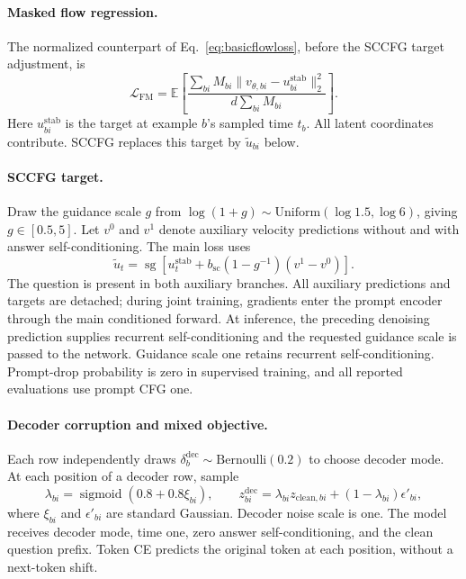 \documentclass{article}
\newcommand{\E}{\mathbb{E}}
\newcommand{\sg}{\operatorname{sg}}
\begin{document}
\paragraph{Masked flow regression.}
The normalized counterpart of Eq.~\eqref{eq:basicflowloss}, before the SCCFG target adjustment, is
\begin{equation}
 \mathcal L_{\mathrm{FM}}=
 \E\!\left[\frac{\sum_{bi} M_{bi}\|v_{\theta,bi}-u_{bi}^{\mathrm{stab}}\|_2^2}
 {d\sum_{bi} M_{bi}}\right].
 \label{eq:methodflowloss}
\end{equation}
Here $u_{bi}^{\mathrm{stab}}$ is the target at example $b$'s sampled time $t_b$. All latent coordinates contribute. SCCFG replaces this target by $\widetilde u_{bi}$ below.

\paragraph{SCCFG target.}
Draw the guidance scale $g$ from $\log(1+g)\sim\mathrm{Uniform}(\log1.5,\log6)$, giving $g\in[0.5,5]$. Let $v^0$ and $v^1$ denote auxiliary velocity predictions without and with answer self-conditioning. The main loss uses
\begin{equation}
 \widetilde u_t=\sg\!\left[u_t^{\mathrm{stab}}+b_{\mathrm{sc}}(1-g^{-1})(v^1-v^0)\right].
 \label{eq:methodscguidance}
\end{equation}
The question is present in both auxiliary branches. All auxiliary predictions and targets are detached; during joint training, gradients enter the prompt encoder through the main conditioned forward. At inference, the preceding denoising prediction supplies recurrent self-conditioning and the requested guidance scale is passed to the network. Guidance scale one retains recurrent self-conditioning. Prompt-drop probability is zero in supervised training, and all reported evaluations use prompt CFG one.

\paragraph{Decoder corruption and mixed objective.}
Each row independently draws $\delta_b^{\mathrm{dec}}\sim\mathrm{Bernoulli}(0.2)$ to choose decoder mode. At each position of a decoder row, sample
\[
 \lambda_{bi}=\operatorname{sigmoid}(0.8+0.8\xi_{bi}),\qquad
 z^{\mathrm{dec}}_{bi}=\lambda_{bi}z_{\mathrm{clean},bi}+(1-\lambda_{bi})\epsilon'_{bi},
\]
where $\xi_{bi}$ and $\epsilon'_{bi}$ are standard Gaussian. Decoder noise scale is one. The model receives decoder mode, time one, zero answer self-conditioning, and the clean question prefix. Token CE predicts the original token at each position, without a next-token shift.
\end{document}
